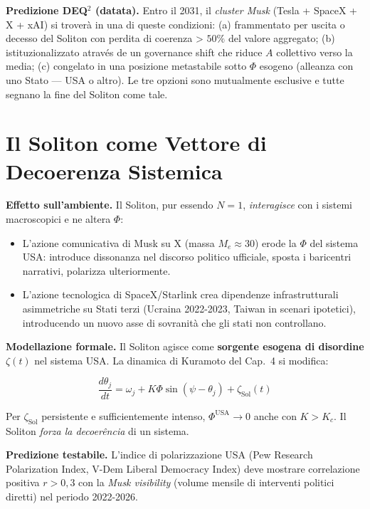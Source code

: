 \Conj{} \textbf{Predizione DEQ$^2$ (datata).} Entro il 2031, il
\emph{cluster Musk} (Tesla + SpaceX + X + xAI) si troverà in una di
queste condizioni: (a) frammentato per uscita o decesso del Soliton con
perdita di coerenza \textgreater{} \(50\%\) del valore aggregato; (b)
istituzionalizzato através de un governance shift che riduce \(A\)
collettivo verso la media; (c) congelato in una posizione metastabile
sotto \(\Phi\) esogeno (alleanza con uno Stato --- USA o altro). Le tre
opzioni sono mutualmente esclusive e tutte segnano la fine del Soliton
come tale.



\section{Il Soliton come Vettore di Decoerenza
Sistemica}\label{il-solitone-come-vettore-di-decoerência-sistemica}

\Hypoth{} \textbf{Effetto sull'ambiente.} Il Soliton, pur essendo
\(N = 1\), \emph{interagisce} con i sistemi macroscopici e ne altera
\(\Phi\):

\begin{itemize}
\tightlist
\item
  L'azione comunicativa di Musk su X (massa \(M_e \approx 30\)) erode la
  \(\Phi\) del sistema USA: introduce dissonanza nel discorso politico
  ufficiale, sposta i baricentri narrativi, polarizza ulteriormente.
\item
  L'azione tecnologica di SpaceX/Starlink crea dipendenze
  infrastrutturali asimmetriche su Stati terzi (Ucraina 2022-2023,
  Taiwan in scenari ipotetici), introducendo un nuovo asse di sovranità
  che gli stati non controllano.
\end{itemize}

\Proved{} \textbf{Modellazione formale.} Il Soliton agisce come
\textbf{sorgente esogena di disordine} \(\zeta(t)\) nel sistema USA. La
dinamica di Kuramoto del Cap.~4 si modifica:

\[
\frac{d\theta_j}{dt} = \omega_j + K\Phi \sin(\psi - \theta_j) + \zeta_{\text{Sol}}(t)
\]

Per \(\zeta_{\text{Sol}}\) persistente e sufficientemente intenso,
\(\Phi^{\text{USA}} \to 0\) anche con \(K > K_c\). Il Soliton
\emph{forza la decoerência} di un sistema.

\Conj{} \textbf{Predizione testabile.} L'indice di polarizzazione USA
(Pew Research Polarization Index, V-Dem Liberal Democracy Index) deve
mostrare correlazione positiva \(r > 0{,}3\) con la \emph{Musk
visibility} (volume mensile di interventi politici diretti) nel periodo
2022-2026.



